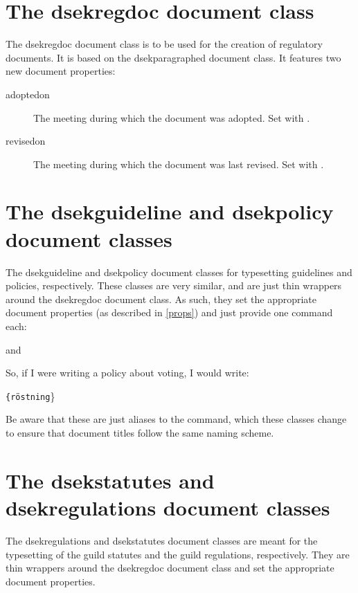 \documentclass[a4paper, oneside]{ltxdoc}
\begin{document}
\section{The \textsf{dsekregdoc} document class}
The \textsf{dsekregdoc} document class is to be used for the creation of
regulatory documents.  It is based on the \textsf{dsekparagraphed} document
class.  It features two new document properties:

\begin{description}
\item[adoptedon] The meeting during which the document was adopted.  Set with
  .
\item[revisedon] The meeting during which the document was last revised.  Set
  with .
\end{description}

\section{The \textsf{dsekguideline} and \textsf{dsekpolicy} document classes}
The \textsf{dsekguideline} and \textsf{dsekpolicy} document classes for
typesetting guidelines and policies, respectively.  These classes are very
similar, and are just thin wrappers around the \textsf{dsekregdoc} document
class.  As such, they set the appropriate document properties (as described in
\ref{props}) and just provide one command each:

\begin{center}
   and 
\end{center}

So, if I were writing a policy about voting, I would write:

\begin{center}
  \texttt{\{röstning}\}
\end{center}

Be aware that these are just aliases to the  command, which these
classes change to ensure that document titles follow the same naming scheme.

\section{The \textsf{dsekstatutes} and \textsf{dsekregulations} document classes}
The \textsf{dsekregulations} and \textsf{dsekstatutes} document classes are
meant for the typesetting of the guild statutes and the guild regulations,
respectively.  They are thin wrappers around the \textsf{dsekregdoc} document
class and set the appropriate document properties.
\end{document}
